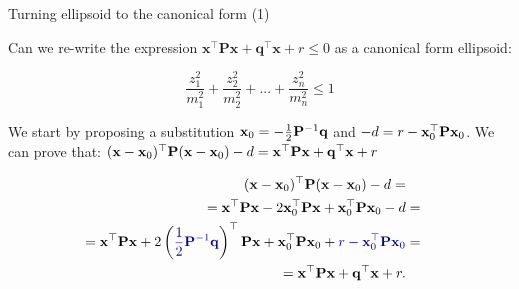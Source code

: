 \documentclass{beamer}
\begin{document}
\begin{frame}{Turning ellipsoid to the canonical form (1)}
	\begin{flushleft}
		
		Can we re-write the expression $\mathbf{x}^\top \mathbf{P} \mathbf{x} + \mathbf{q}^\top\mathbf{x} + r \leq 0$ as a canonical form ellipsoid:
		
		\begin{equation}
			\frac{z_1^2}{m_1^2} + \frac{z_2^2}{m_2^2} + ... + 
			\frac{z_n^2}{m_n^2} \leq 1
		\end{equation}
		
		We start by proposing a substitution $\mathbf{x}_0 = - \frac{1}{2}\mathbf{P}^{-1}\mathbf{q}$ and $-d = r - \mathbf{x}_0^\top \mathbf{P} \mathbf{x}_0$. We can prove that: $(\mathbf{x} - \mathbf{x}_0)^\top \mathbf{P}(\mathbf{x} - \mathbf{x}_0) - d =
		\mathbf{x}^\top \mathbf{P} \mathbf{x} + \mathbf{q}^\top\mathbf{x} + r$
		
		\begin{align}
			(\bo{x} - \bo{x}_0)\T \bo{P}(\bo{x} - \bo{x}_0) - d =
			\\
			= \bo{x}\T\bo{P}\bo{x} - 2\bo{x}_0\T\bo{P}\bo{x} + \bo{x}_0\T\bo{P}\bo{x}_0 - d &=
			\\
			= \bo{x}\T\bo{P}\bo{x} + 2\left(\textcolor{mydarkblue}{\frac{1}{2}\bo{P}^{-1}\bo{q}}\right)\T\bo{P}\bo{x} + \bo{x}_0\T\bo{P}\bo{x}_0 + \textcolor{mydarkblue}{r - \bo{x}_0\T \bo{P} \bo{x}_0} &=
			\\
			= \bo{x}\T\bo{P}\bo{x} + \bo{q}\T \bo{x} + r.
		\end{align}
		
	\end{flushleft}
\end{frame}
\end{document}
